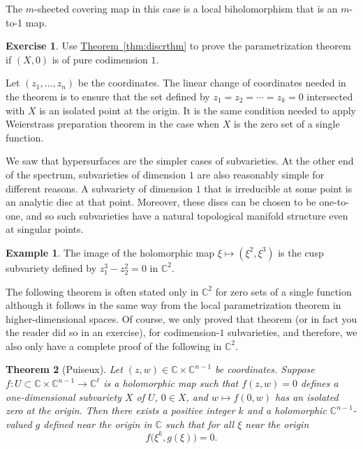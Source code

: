 \documentclass[12pt,openany]{book}
\newcommand{\C}{{\mathbb{C}}}
\newcommand{\myindex}[1]{#1\index{#1}}
\theoremstyle{plain}
\newtheorem{thm}{Theorem}[section]
\theoremstyle{remark}
\theoremstyle{definition}
\newenvironment{exbox}{%
    \def\FrameCommand{\vrule width 1pt \relax\hspace{10pt}}%
    \MakeFramed{\advance\hsize-\width\FrameRestore}%
}{%
    \endMakeFramed
}
\theoremstyle{exercise}
\newtheorem{exercise}{Exercise}[section]
\theoremstyle{example}
\newtheorem{example}[thm]{Example}
\newcommand{\thmref}[1]{\hyperref[#1]{Theorem~\ref*{#1}}}
\begin{document}
\pagebreak[2]
The $m$-sheeted covering map in this case is a local biholomorphism
that is an $m$-to-1 map.

\begin{exbox}
\begin{exercise}
Use \thmref{thm:discrthm}
to prove the parametrization theorem if $(X,0)$ is
of pure codimension $1$.
\end{exercise}
\end{exbox}

Let $(z_1,\ldots,z_n)$ be the coordinates.
The linear change of coordinates needed in the theorem is
to ensure that the set defined by $z_1=z_2=\cdots=z_k = 0$ intersected
with $X$ is an isolated point at the origin.  It is
the same condition needed to apply Weierstrass preparation theorem in the case
when $X$ is the zero set of a single function.

\medskip

We saw that hypersurfaces are the simpler cases of
subvarieties.  At the other end of the spectrum,
subvarieties of dimension $1$ are also reasonably simple for different reasons.
A subvariety of dimension $1$ that is irreducible at some point
is an analytic disc at that point.
Moreover, these discs can be chosen to be one-to-one,
and so such subvarieties have a natural topological manifold structure
even at singular points.

\begin{example}
The image of the holomorphic map
$\xi \mapsto (\xi^2,\xi^3)$ is the cusp subvariety
defined by $z_1^3-z_2^2 = 0$ in $\C^2$.
\end{example}


The following theorem is often stated only in $\C^2$ for zero sets of
a single function although it follows in
the same way from the local parametrization theorem in higher-dimensional
spaces.  Of course, we only
proved that theorem (or in fact you the reader did so in an exercise), for
codimension-$1$ subvarieties, and therefore, we also only have a complete
proof of the following in $\C^2$.

\begin{thm}[\myindex{Puiseux}]
Let $(z,w) \in \C \times \C^{n-1}$ be coordinates.
Suppose $f \colon U \subset \C \times \C^{n-1} \to \C^\ell$
is a holomorphic map such that
$f(z,w) = 0$ defines a one-dimensional subvariety $X$ of $U$,
$0 \in X$,
and $w \mapsto f(0,w)$ has an isolated zero at the origin.
Then there exists a positive integer $k$ and a holomorphic $\C^{n-1}$-valued $g$
defined near
the origin in $\C$ such that
for all $\xi$ near the origin
\begin{equation*}
f\bigl(\xi^k,g(\xi)\bigr) = 0 .
\end{equation*}
\end{thm}
\end{document}
